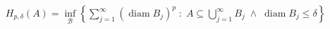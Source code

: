 \documentclass[preview]{standalone}
\begin{document}
\begin{align*}
H_{p,\delta}(A) = \inf_{\mathcal{B}} \left\{ \sum_{j=1}^\infty (\operatorname{diam} B_j)^p \;:\; A \subseteq \bigcup_{j=1}^\infty B_j \;\wedge\; \operatorname{diam} B_j \leq \delta \right\}
\end{align*}
\end{document}
